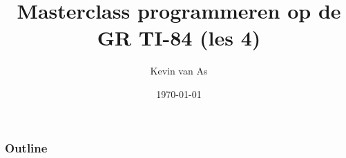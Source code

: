 \documentclass{beamer}
\title{Masterclass programmeren op de GR TI-84 (les 4)}
\author{Kevin van As}
\date{\today}
\begin{document}
\begin{frame}
\titlepage
\end{frame}



\begin{frame}
\frametitle{Outline}
\tableofcontents
\end{frame}




% 


% 
% 
%
%
% 
%
%
% 
%
\end{document}
